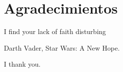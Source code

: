 %
%
%
%
%
%
%
%
%
%
%
%
%

\chapter{Agradecimientos}

\begin{FraseCelebre}
\begin{Frase}
I find your lack of faith disturbing\end{Frase}
\begin{Fuente}
Darth Vader, Star Wars: A New Hope.
\end{Fuente}
\end{FraseCelebre}

I thank you.

\endinput
